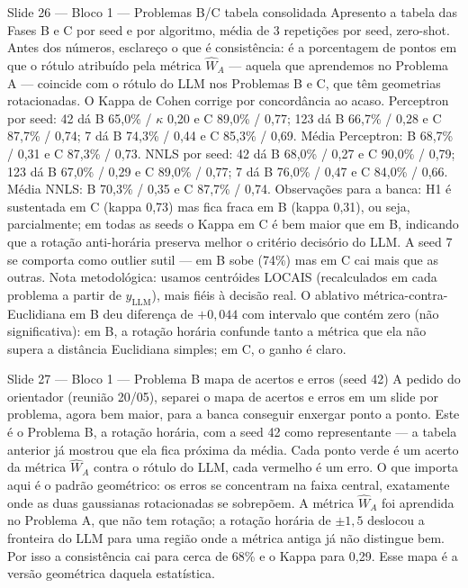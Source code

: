 \documentclass[aspectratio=169,10pt]{beamer}
\begin{document}
\begin{frame}{Slide 26 --- Bloco 1 --- Problemas B/C tabela consolidada}
\footnotesize
Apresento a tabela das Fases B e C por seed e por algoritmo, m\'edia de 3 repeti\c{c}\~oes por seed, zero-shot. Antes dos n\'umeros, esclare\c{c}o o que \'e consist\^encia: \'e a porcentagem de pontos em que o r\'otulo atribu\'ido pela m\'etrica $\hat W_A$ --- aquela que aprendemos no Problema A --- coincide com o r\'otulo do LLM nos Problemas B e C, que t\^em geometrias rotacionadas. O Kappa de Cohen corrige por concord\^ancia ao acaso. Perceptron por seed: 42 d\'a B 65,0\% / $\kappa$ 0,20 e C 89,0\% / 0,77; 123 d\'a B 66,7\% / 0,28 e C 87,7\% / 0,74; 7 d\'a B 74,3\% / 0,44 e C 85,3\% / 0,69. M\'edia Perceptron: B 68,7\% / 0,31 e C 87,3\% / 0,73. NNLS por seed: 42 d\'a B 68,0\% / 0,27 e C 90,0\% / 0,79; 123 d\'a B 67,0\% / 0,29 e C 89,0\% / 0,77; 7 d\'a B 76,0\% / 0,47 e C 84,0\% / 0,66. M\'edia NNLS: B 70,3\% / 0,35 e C 87,7\% / 0,74. Observa\c{c}\~oes para a banca: H1 \'e sustentada em C (kappa 0,73) mas fica fraca em B (kappa 0,31), ou seja, parcialmente; em todas as seeds o Kappa em C \'e bem maior que em B, indicando que a rota\c{c}\~ao anti-hor\'aria preserva melhor o crit\'erio decis\'orio do LLM. A seed 7 se comporta como outlier sutil --- em B sobe (74\%) mas em C cai mais que as outras. Nota metodol\'ogica: usamos centr\'oides LOCAIS (recalculados em cada problema a partir de $y_{\text{LLM}}$), mais fi\'eis \`a decis\~ao real. O ablativo m\'etrica-contra-Euclidiana em B deu diferen\c{c}a de $+0{,}044$ com intervalo que cont\'em zero (n\~ao significativa): em B, a rota\c{c}\~ao hor\'aria confunde tanto a m\'etrica que ela n\~ao supera a dist\^ancia Euclidiana simples; em C, o ganho \'e claro.
\end{frame}

\begin{frame}{Slide 27 --- Bloco 1 --- Problema B mapa de acertos e erros (seed 42)}
\footnotesize
A pedido do orientador (reuni\~ao 20/05), separei o mapa de acertos e erros em um slide por problema, agora bem maior, para a banca conseguir enxergar ponto a ponto. Este \'e o Problema B, a rota\c{c}\~ao hor\'aria, com a seed 42 como representante --- a tabela anterior j\'a mostrou que ela fica pr\'oxima da m\'edia. Cada ponto verde \'e um acerto da m\'etrica $\hat W_A$ contra o r\'otulo do LLM, cada vermelho \'e um erro. O que importa aqui \'e o padr\~ao geom\'etrico: os erros se concentram na faixa central, exatamente onde as duas gaussianas rotacionadas se sobrep\~oem. A m\'etrica $\hat W_A$ foi aprendida no Problema A, que n\~ao tem rota\c{c}\~ao; a rota\c{c}\~ao hor\'aria de $\pm 1{,}5$ deslocou a fronteira do LLM para uma regi\~ao onde a m\'etrica antiga j\'a n\~ao distingue bem. Por isso a consist\^encia cai para cerca de 68\% e o Kappa para 0,29. Esse mapa \'e a vers\~ao geom\'etrica daquela estat\'istica.
\end{frame}
\end{document}
